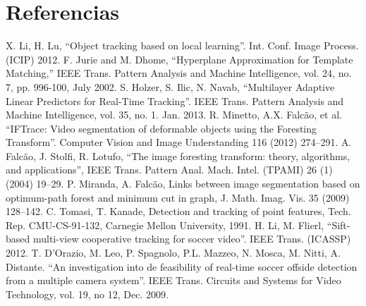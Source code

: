 \documentclass[twocolumn,a4paper,10pt]{article}
\begin{document}
\section*{Referencias}
\begin{thebibliography}{99}
     X. Li, H. Lu, ``Object tracking based on local learning''. Int. Conf. Image Process. (ICIP) 2012.
     F. Jurie and M. Dhome, “Hyperplane Approximation for Template Matching,” IEEE Trans. Pattern Analysis and Machine Intelligence, vol. 24, no. 7, pp. 996-100, July 2002.
     S. Holzer, S. Ilic, N. Navab, ``Multilayer Adaptive Linear Predictors for Real-Time Tracking''. 
                  IEEE Trans. Pattern Analysis and Machine Intelligence, vol. 35, no. 1. Jan. 2013.
     R. Minetto, A.X. Falcão, et al. ``IFTrace: Video segmentation of deformable objects using the Foresting Transform''. 
                      Computer Vision and Image Understanding 116 (2012) 274–291.
     A. Falcão, J. Stolfi, R. Lotufo, ``The image foresting transform: theory, algorithms, and applications'', IEEE Trans. Pattern Anal. Mach. Intel. (TPAMI) 26 (1) (2004) 19–29.
     P. Miranda, A. Falcão, Links between image segmentation based on optimum-path forest and minimum cut in graph, J. Math. Imag. Vis. 35 (2009) 128–142.
     C. Tomasi, T. Kanade, Detection and tracking of point features, Tech. Rep. CMU-CS-91-132, Carnegie Mellon University, 1991.
     H. Li, M. Flierl, ``Sift-based multi-view cooperative tracking for soccer video''. IEEE Trans. (ICASSP) 2012.
     T. D'Orazio, M. Leo, P. Spagnolo, P.L. Mazzeo, N. Mosca, M. Nitti, A. Distante. ``An investigation into de feasibility of real-time soccer offside detection
                            from a multiple camera system''. IEEE Trans. Circuits and Systems for Video Technology, vol. 19, no 12, Dec. 2009.


\end{thebibliography}
\end{document}
